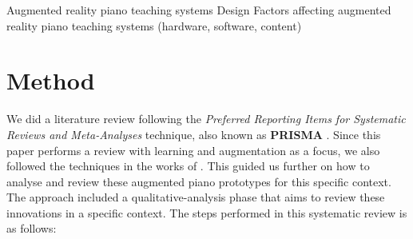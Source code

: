 \documentclass[sigchi, review]{acmart}
\begin{document}

Augmented reality piano teaching systems
Design Factors affecting augmented reality piano teaching systems (hardware, software, content)

\section{Method}
\label{sec: method}
We did a literature review following the \textit{Preferred Reporting Items for Systematic Reviews and Meta-Analyses} technique, also known as \textbf{PRISMA} \cite{moher2009preferred}. Since this paper performs a review with learning and augmentation as a focus, we also followed the techniques in the works of \cite{santos2013augmented, schneegass2016mobile, kljun2015transference, blattgerste2019augmented, mcpherson2015buttons, delgado2011state}.  This guided us further on how to analyse and review these augmented piano prototypes for this specific context. The approach included a  qualitative-analysis phase that aims to review these innovations in a specific context. The steps performed in this systematic review is as follows: 
\end{document}
